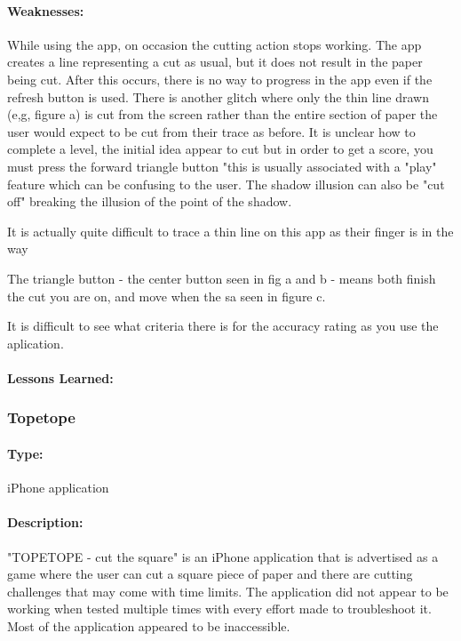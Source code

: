 \documentclass[11pt]{article}
\begin{document}
                \paragraph{Weaknesses:}
                While using the app, on occasion the cutting action stops working. The app creates a line representing a cut as usual, but it does not result in the paper being cut. After this occurs, there is no way to progress in the app even if the refresh button is used. There is another glitch where only the thin line drawn (e,g, figure a) is cut from the screen rather than the entire section of paper the user would expect to be cut from their trace as before. 
                It is unclear how to complete a level, the initial idea appear to cut but in order to get a score, you must press the forward triangle button "this is usually associated with a "play" feature which can be confusing to the user. 
                The shadow illusion can also be "cut off" breaking the illusion of the point of the shadow. 
                
                It is actually quite difficult to trace a thin line on this app as their finger is in the way
                
                The triangle button - the center button seen in fig a and b - means both finish the cut you are on, and move when the sa seen in figure c.  
                
                It is difficult to see what criteria there is for the accuracy rating as you use the aplication. 

                
                \paragraph{Lessons Learned:}
                
                \subsubsection{Topetope}
                 
                \paragraph{Type:} iPhone application 

                \paragraph{Description:}
                "TOPETOPE - cut the square" is an iPhone application that is advertised as a game where the user can cut a square piece of paper and there are cutting challenges that may come with time limits. The application did not appear to be working when tested multiple times with every effort made to troubleshoot it. Most of the application appeared to be inaccessible. 
                
\end{document}

